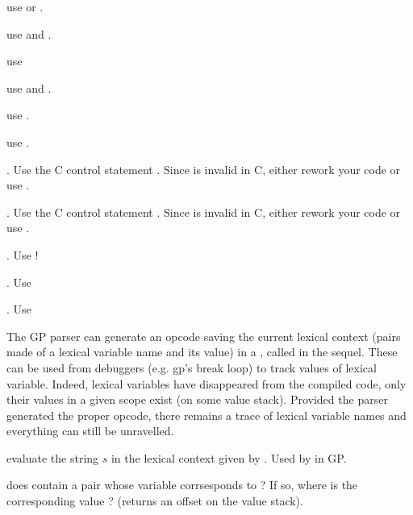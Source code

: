 { use  or .

 use  and .


 use 

 use  and
.

 use .

 use .


. Use the C control statement . Since
 is invalid in C, either rework your code or use .

. Use the C control statement . Since
 is invalid in C, either rework your code or use .

. Use !

. Use 

. Use 


The GP parser can generate an opcode saving the current lexical context
(pairs made of a lexical variable name and its value) in a , called
 in the sequel. These can be used from debuggers (e.g. gp's break
loop) to track values of lexical variable. Indeed, lexical variables have
disappeared from the compiled code, only their values in a given scope exist
(on some value stack). Provided the parser generated the proper opcode, there
remains a trace of lexical variable names and everything can still be
unravelled.

 evaluate the string $s$
in the lexical context given by .  Used by  in GP.

 does  contain
a pair whose variable corrsesponds to  ? If so, where is the
corresponding value ? (returns an offset on the value stack).


}
